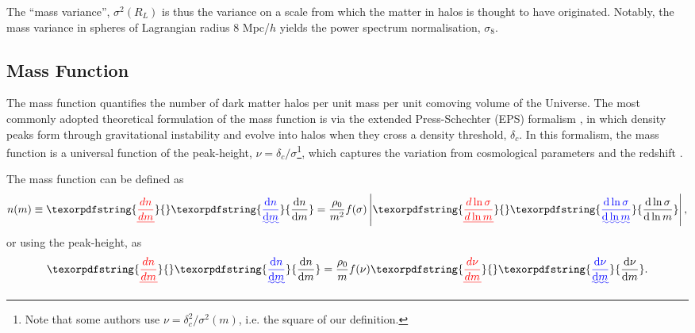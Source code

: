 \documentclass[5p,aas_macros]{elsarticle}
\providecommand{\DIFaddtex}[1]{{\protect\color{blue}\uwave{#1}}} %
\providecommand{\DIFdeltex}[1]{{\protect\color{red}\sout{#1}}}                      %
\providecommand{\DIFaddbegin}{} %
\providecommand{\DIFaddend}{} %
\providecommand{\DIFdelbegin}{} %
\providecommand{\DIFdelend}{} %
\providecommand{\DIFadd}[1]{\texorpdfstring{\DIFaddtex{#1}}{#1}} %
\providecommand{\DIFdel}[1]{\texorpdfstring{\DIFdeltex{#1}}{}} %
\begin{document}
The ``mass variance'', \DIFdelbegin \DIFdel{$\sigma^2(R_L)$ }\DIFdelend \DIFaddbegin \DIFadd{$\sigma^2(R_{\rm L})$ }\DIFaddend is thus the variance on a scale from which the matter in halos is thought to have originated. Notably, the mass variance in spheres of Lagrangian radius 8 Mpc/$h$ yields the power spectrum normalisation, $\sigma_8$.

\subsection{Mass Function}
\label{sec:massfunction}
The mass function quantifies the number of dark matter halos per unit
mass per unit comoving volume of the Universe. 
The most commonly adopted theoretical formulation of the mass function is via the extended Press-Schechter (EPS) formalism \citep{Press1974,Bond1991}, in which density peaks form through gravitational instability and evolve into halos when they cross a density threshold, $\delta_c$. 
In this formalism, the mass function is a universal function of the peak-height, $\nu = \delta_c/\sigma$\footnote{Note that some authors use $\nu = \delta^2_c/\sigma^2(m)$, i.e. the square of our definition.}, which captures the variation from cosmological parameters and the redshift \citep[but note that several recent studies find significant non-universality with redshift, and have provided fits that explicitly account for this departure]{Jenkins2001}. 

The mass function can be defined as
\begin{equation}
\label{eq:hmf}
  n(m) \equiv \DIFdelbegin \DIFdel{\frac{dn}{dm} }\DIFdelend \DIFaddbegin \DIFadd{\frac{{\rm d} n}{{\rm d}m} }\DIFaddend = \frac{\rho_0}{m^2} f(\sigma) \left|\DIFdelbegin \DIFdel{\frac{d\ln\sigma}{d\ln m}}\DIFdelend \DIFaddbegin \DIFadd{\frac{{\rm d}\ln\sigma}{{\rm d}\ln m}}\DIFaddend \right|,
\end{equation}
or using the peak-height, as
\begin{equation}
    \label{eq:theory:hmf_nu}
    \DIFdelbegin \DIFdel{\frac{dn}{dm} }\DIFdelend \DIFaddbegin \DIFadd{\frac{{\rm d}n}{{\rm d}m} }\DIFaddend = \frac{\rho_0}{m} f(\nu) \DIFdelbegin \DIFdel{\frac{d \nu}{d m}}\DIFdelend \DIFaddbegin \DIFadd{\frac{{\rm d} \nu}{{\rm d} m}}\DIFaddend .
\end{equation}
\DIFdelbegin %
\end{document}
